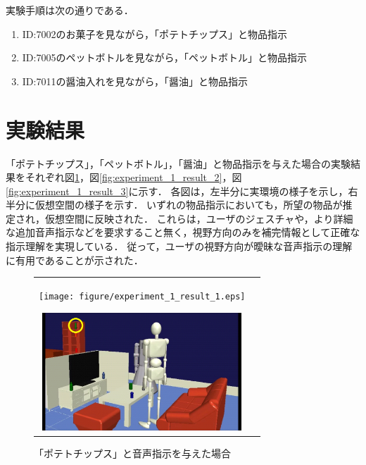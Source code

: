 実験手順は次の通りである．
\begin{enumerate}
\item{ID:7002のお菓子を見ながら，「ポテトチップス」と物品指示}
\item{ID:7005のペットボトルを見ながら，「ペットボトル」と物品指示}
\item{ID:7011の醤油入れを見ながら，「醤油」と物品指示}
\end{enumerate}


\section{実験結果}
「ポテトチップス」，「ペットボトル」，「醤油」と物品指示を与えた場合の実験結果をそれぞれ図{\ref{fig:experiment_1_result_1}}，図{\ref{fig:experiment_1_result_2}}，図{\ref{fig:experiment_1_result_3}}に示す．
各図は，左半分に実環境の様子を示し，右半分に仮想空間の様子を示す．
いずれの物品指示においても，所望の物品が推定され，仮想空間に反映された．
これらは，ユーザのジェスチャや，より詳細な追加音声指示などを要求すること無く，視野方向のみを補完情報として正確な指示理解を実現している．
従って，ユーザの視野方向が曖昧な音声指示の理解に有用であることが示された．
%
\begin{figure}[htbp]
\begin{tabular}{cc}
%
  \begin{minipage}{0.5\textwidth}
    \begin{center}
      \texttt{[image: figure/experiment\_1\_result\_1.eps]}
    \end{center}
  \end{minipage}
%
  \begin{minipage}{0.5\textwidth}
    \begin{center}
      \includegraphics[width=75mm]{figure/experiment_1_result_1_s.eps}
    \end{center}
  \end{minipage}
%
\end{tabular}
\caption{「ポテトチップス」と音声指示を与えた場合}
\label{fig:experiment_1_result_1}
\end{figure}
